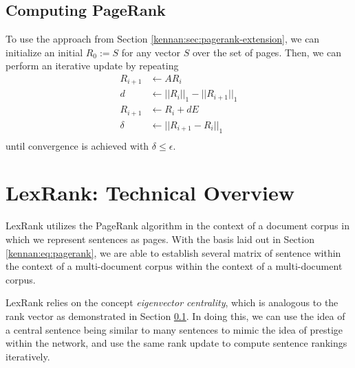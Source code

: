 \documentclass[../writeup.tex]{subfiles}
\begin{document}
\subsection{Computing PageRank}\label{kennan:sec:computing-pagerank}
To use the approach from Section \ref{kennan:sec:pagerank-extension}, we can initialize
an initial $R_0 := S$ for any vector $S$ over the set of pages. Then, we can perform
an iterative update by repeating
\begin{align}\label{kennan:eq:pagerank-power-procedure}
    R_{i+1} & \leftarrow AR_i                          \\
    d       & \leftarrow || R_i ||_1 - || R_{i+1} ||_1 \\
    R_{i+1} & \leftarrow R_i + dE                      \\
    \delta  & \leftarrow || R_{i+1} - R_i ||_1         \\
\end{align}
until convergence is achieved with $\delta \leq \epsilon$.

\section{LexRank: Technical Overview}\label{kennan:sec:lexrank}
LexRank \autocite*{lexrank-summarization} utilizes the PageRank algorithm in the context
of a document corpus in which we represent sentences as pages. With the basis laid out
in Section \ref{kennan:eq:pagerank}, we are able to establish several matrix of sentence
 within the context of a multi-document corpus within the
context of a multi-document corpus.

LexRank relies on the concept \textit{eigenvector centrality}, which is analogous to the rank vector as demonstrated
in Section \ref{kennan:sec:computing-pagerank}. In doing this, we can use the idea of a central sentence
being similar to many sentences to mimic the idea of prestige within the network, and use the same rank update
to compute sentence rankings iteratively.
\end{document}
